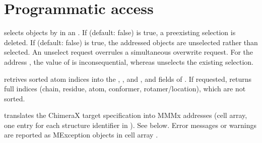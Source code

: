 \documentclass[letterpaper,10pt,english]{sphinxmanual}
\begin{document}
\section{Programmatic access}
\label{\detokenize{MMMx_addresses:programmatic-access}}
\begin{sphinxVerbatim}[commandchars=\\\{\}]
\PYG{p}{[}\PYG{p}{]}  
\end{sphinxVerbatim}

selects objects by  in an . If  (default: false) is true, a pre\sphinxhyphen{}existing selection is deleted.
If  (default: false) is true, the addressed objects are unselected rather than selected. An unselect request overrules a simultaneous overwrite request.
For the address , the value of  is inconsequential, whereas  unselects the existing selection.

\begin{sphinxVerbatim}[commandchars=\\\{\}]
\PYG{p}{[}\PYG{p}{]}  
\end{sphinxVerbatim}

retrives sorted atom indices into the , , and , and  fields of .
If requested,  returns full indices (chain, residue, atom, conformer, rotamer/location), which are not sorted.

\begin{sphinxVerbatim}[commandchars=\\\{\}]
\PYG{p}{[}\PYG{p}{]}  
\end{sphinxVerbatim}

translates the ChimeraX target specification  into MMMx addresses (cell array, one entry for each structure identifier in ). See below.
Error messages or warnings are reported as MException objects in cell array .
\end{document}
